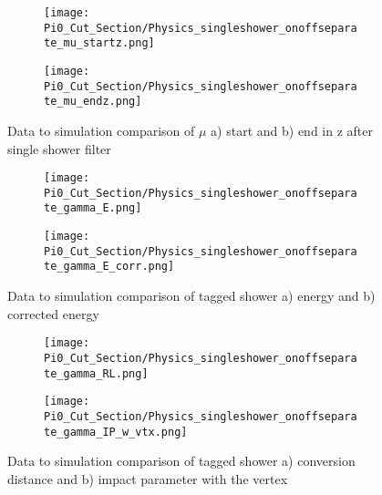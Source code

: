 \begin{figure}[H]
  \begin{subfigure}[t]{0.3\textwidth}
\texttt{[image: Pi0\_Cut\_Section/Physics\_singleshower\_onoffseparate\_mu\_startz.png]}
  \caption{ }
  \end{subfigure} 
  \hspace{34mm}
  \begin{subfigure}[t]{0.3\textwidth}
\texttt{[image: Pi0\_Cut\_Section/Physics\_singleshower\_onoffseparate\_mu\_endz.png]}
  \caption{ }
  \end{subfigure} 
\caption{ Data to simulation comparison of $\mu$ a) start and b) end in z after single shower filter }
\label{fig:physics_singleshower_z}
\end{figure}

\begin{figure}[H]
  \begin{subfigure}[t]{0.3\textwidth}
\texttt{[image: Pi0\_Cut\_Section/Physics\_singleshower\_onoffseparate\_gamma\_E.png]}
  \caption{ }
  \end{subfigure} 
  \hspace{34mm}
  \begin{subfigure}[t]{0.3\textwidth}
\texttt{[image: Pi0\_Cut\_Section/Physics\_singleshower\_onoffseparate\_gamma\_E\_corr.png]}
  \caption{ }
  \end{subfigure} 
\caption{ Data to simulation comparison of tagged shower a) energy and b) corrected energy }
\label{fig:physics_singleshower_e}
\end{figure}

\begin{figure}[H]
  \begin{subfigure}[t]{0.3\textwidth}
\texttt{[image: Pi0\_Cut\_Section/Physics\_singleshower\_onoffseparate\_gamma\_RL.png]}
  \caption{ }
  \end{subfigure} 
  \hspace{34mm}
  \begin{subfigure}[t]{0.3\textwidth}
\texttt{[image: Pi0\_Cut\_Section/Physics\_singleshower\_onoffseparate\_gamma\_IP\_w\_vtx.png]}
  \caption{ }
  \end{subfigure} 
\caption{ Data to simulation comparison of tagged shower a) conversion distance and b) impact parameter with the vertex  }
\label{fig:physics_singleshower_ip}
\end{figure}

